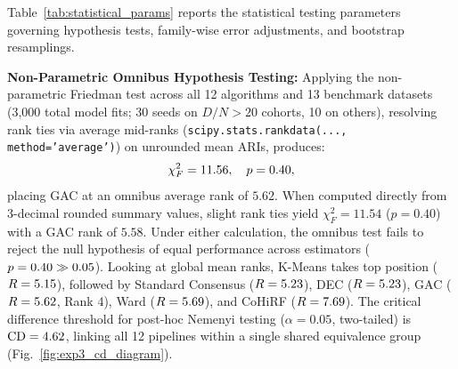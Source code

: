 \documentclass[pdflatex,sn-mathphys-num]{sn-jnl}
\theoremstyle{thmstyleone}
\theoremstyle{thmstyletwo}
\theoremstyle{thmstylethree}
\begin{document}
Table~\ref{tab:statistical_params} reports the statistical testing parameters governing hypothesis tests, family-wise error adjustments, and bootstrap resamplings.

\begin{table}[!t]
\caption{Statistical Testing Parameters and Configurations}
\label{tab:statistical_params}
\centering
{}
\end{table}

\textbf{Non-Parametric Omnibus Hypothesis Testing:}
Applying the non-parametric Friedman test across all 12 algorithms and 13 benchmark datasets (3{,}000 total model fits; 30 seeds on $D/N > 20$ cohorts, 10 on others), resolving rank ties via average mid-ranks (\texttt{scipy.stats.rankdata(..., method='average')}) on unrounded mean ARIs, produces:
\begin{equation}
 \chi_F^2 = 11.56, \quad p = 0.40,
\end{equation}
placing GAC at an omnibus average rank of $5.62$. When computed directly from 3-decimal rounded summary values, slight rank ties yield $\chi_F^2 = 11.54$ ($p = 0.40$) with a GAC rank of $5.58$. Under either calculation, the omnibus test fails to reject the null hypothesis of equal performance across estimators ($p = 0.40 \gg 0.05$). Looking at global mean ranks, K-Means takes top position ($R = 5.15$), followed by Standard Consensus ($R = 5.23$), DEC ($R = 5.23$), GAC ($R = 5.62$, Rank 4), Ward ($R = 5.69$), and CoHiRF ($R = 7.69$). The critical difference threshold for post-hoc Nemenyi testing ($\alpha = 0.05$, two-tailed) is $\text{CD} = 4.62$, linking all 12 pipelines within a single shared equivalence group (Fig.~\ref{fig:exp3_cd_diagram}).
\end{document}
